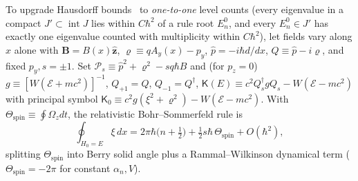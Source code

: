 \documentclass[aps,prl,reprint,superscriptaddress,nofootinbib,floatfix]{revtex4-2}
\theoremstyle{prlthm}
\begin{document}
To upgrade Hausdorff bounds~\citep{BeckerFujiieWittsten2025Bohr} to \emph{one-to-one} level counts (every eigenvalue in a compact $J'\subset\operatorname{int}J$ lies within $C\hbar^2$ of a rule root $E_n^0$, and every $E_n^0\in J'$ has exactly one eigenvalue counted with multiplicity within $C\hbar^2$), let fields vary along $x$ alone with $\mathbf{B}=B(x)\hat{\mathbf{z}}$, $\varrho\equiv qA_y(x)-p_y$, $\hat{p}=-i\hbar d/dx$, $Q\equiv\hat{p}-i\varrho$, and fixed $p_y,s=\pm 1$. Set $\mathcal{P}_s\equiv\hat{p}^2+\varrho^2-sq\hbar B$ and (for $p_z=0$) $g\equiv[W(\mathcal{E}+mc^2)]^{-1}$, $Q_{+1}=Q$, $Q_{-1}=Q^\dagger$, $\mathsf{K}(E)\equiv c^2Q_s^\dagger gQ_s-W(\mathcal{E}-mc^2)$ with principal symbol $\mathsf{K}_0\equiv c^2g(\xi^2+\varrho^2)-W(\mathcal{E}-mc^2)$. With $\Theta_\text{spin}\equiv\oint\Omega_zdt$, the relativistic Bohr--Sommerfeld rule is~\citep{Keppeler2003Semiclassical}
\begin{equation}
  \oint_{H_0=E}\xi\,dx=2\pi\hbar\big(n+\tfrac{1}{2}\big)+\tfrac{1}{2}s\hbar\,\Theta_\text{spin}+O(\hbar^2),
  \label{eq:bs_rule}
\end{equation}
splitting $\Theta_\text{spin}$ into Berry solid angle plus a Rammal--Wilkinson dynamical term ($\Theta_\text{spin}=-2\pi$ for constant $\alpha_n,V$).
\end{document}

